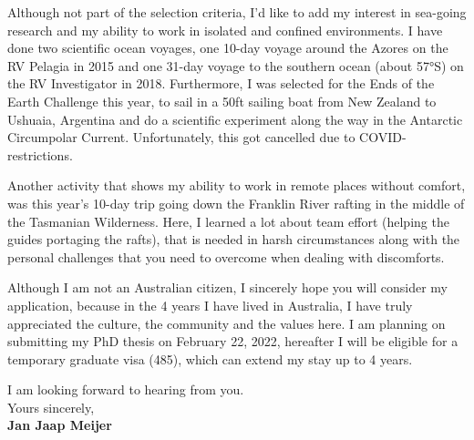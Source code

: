 \documentclass[11pt]{article}
\def\firstname{Jan Jaap}
\def\familyname{Meijer}
\def\FileAuthor{\firstname{ }\familyname}
\begin{document}
Although not part of the selection criteria, I’d like to add my interest in sea-going research and my ability to work in isolated and confined environments. I have done two scientific ocean voyages, one 10-day voyage around the Azores on the RV Pelagia in 2015 and one 31-day voyage to the southern ocean (about 57°S) on the RV Investigator in 2018. Furthermore, I was selected for the Ends of the Earth Challenge this year, to sail in a 50ft sailing boat from New Zealand to Ushuaia, Argentina and do a scientific experiment along the way in the Antarctic Circumpolar Current. Unfortunately, this got cancelled due to COVID-restrictions.

Another activity that shows my ability to work in remote places without comfort, was this year’s 10-day trip going down the Franklin River rafting in the middle of the Tasmanian Wilderness. Here, I learned a lot about team effort (helping the guides portaging the rafts), that is needed in harsh circumstances along with the personal challenges that you need to overcome when dealing with discomforts.

Although I am not an Australian citizen, I sincerely hope you will consider my application, because in the 4 years I have lived in Australia, I have truly appreciated the culture, the community and the values here. I am planning on submitting my PhD thesis on February 22, 2022, hereafter I will be eligible for a temporary graduate visa (485), which can extend my stay up to 4 years.

I am looking forward to hearing from you.\\[1.5em]

Yours sincerely,\\[3em] %
%
{\bfseries \FileAuthor}\\
%
\end{document}
